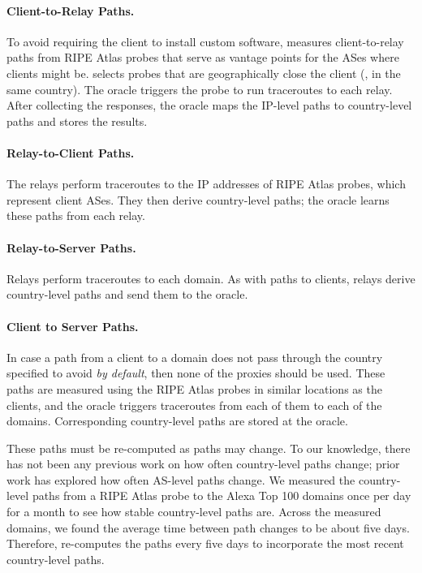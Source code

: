 \paragraph{Client-to-Relay Paths.} 
To avoid requiring the client to install custom software, \system{}
measures client-to-relay paths from RIPE Atlas probes that serve as 
vantage points for the ASes where \system{} clients might be.  \system{} selects
probes that
are geographically close the client (\eg, in the same 
country). The oracle triggers the probe to run traceroutes
to each relay.  After collecting the responses, the oracle maps 
the IP-level paths to country-level paths and stores the results.

\paragraph{Relay-to-Client Paths.} The \system{} relays perform
traceroutes to the IP addresses of RIPE Atlas probes, which 
represent client ASes.  They then derive country-level paths; the
oracle learns these paths from each relay.  

\paragraph{Relay-to-Server Paths.} Relays perform 
traceroutes to each domain.  As with paths to clients,
relays derive country-level paths and send them to the oracle.

\paragraph{Client to Server Paths.} In case a path from a client to a 
domain does not pass through the country specified to avoid {\it by default}, 
then none of the proxies should be used.  
These paths are measured using the RIPE Atlas probes in similar
locations as the clients, and the oracle triggers traceroutes from
each of them to each of the domains.  Corresponding country-level
paths are stored at the oracle.

These paths must be re-computed 
as paths may change.  To our knowledge, there has not been any previous work 
on how often country-level paths change; prior work has explored how often 
AS-level paths change.  We measured the country-level paths from a RIPE Atlas probe to the 
Alexa Top 100 domains once per day for a month to see how stable country-level paths 
are.  Across the measured domains, we found the average time between path changes to 
be about five days.  Therefore, \system{} re-computes the paths every five days to incorporate the 
most recent country-level paths.  

